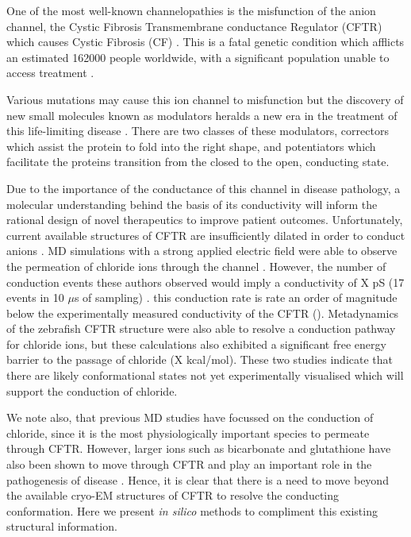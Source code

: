 One of the most well-known channelopathies is the misfunction of the anion channel, the Cystic Fibrosis Transmembrane conductance Regulator (CFTR) which causes Cystic Fibrosis (CF) \cite{riordan1989,gadsby2006}. This is a fatal genetic condition which afflicts an estimated 162000 people worldwide, with a significant population unable to access treatment \cite{guo2022}.

Various mutations may cause this ion channel to misfunction but the discovery of new small molecules known as modulators heralds a new era in the treatment of this life-limiting disease \cite{}. There are two classes of these modulators, correctors which assist the protein to fold into the right shape, and potentiators which facilitate the proteins transition from the closed to the open, conducting state. 

Due to the importance of the conductance of this channel in disease pathology, a molecular understanding behind the basis of its conductivity will inform the rational design of novel therapeutics to improve patient outcomes. Unfortunately, current available structures of CFTR are insufficiently dilated in order to conduct anions \cite{}. MD simulations with a strong applied electric field were able to observe the permeation of chloride ions through the channel \cite{}. However, the number of conduction events these authors observed would imply a conductivity of X pS (17 events in 10 $\mu$s of sampling) . this conduction rate is rate an order of magnitude below the experimentally measured conductivity of the CFTR (). Metadynamics of the zebrafish CFTR structure were also able to resolve a conduction pathway for chloride ions, but these calculations also exhibited a significant free energy barrier to the  passage of chloride (X kcal/mol). These two studies indicate that there are likely conformational states not yet experimentally visualised which will support the conduction of chloride. 

We note also, that previous MD studies have focussed on the conduction of chloride, since it is the most physiologically important species to permeate through CFTR. However, larger ions such as bicarbonate and glutathione have also been shown to move through CFTR and play an important role in the pathogenesis of disease \cite{}. Hence, it is clear that there is a need to move beyond the available cryo-EM structures of CFTR to resolve the conducting conformation. Here we present \textit{in silico} methods to compliment this existing structural information. 

